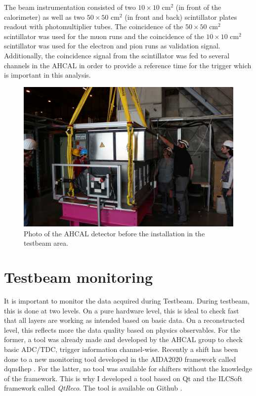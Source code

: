 The beam instrumentation consisted of two $10\times10$ cm$^2$ (in front of the calorimeter) as well as two $50\times50$ cm$^2$ (in front and back) scintillator plates readout with photomultiplier tubes. The coincidence of the $50\times50$ cm$^2$ scintillator was used for the muon runs and the coincidence of the $10\times10$ cm$^2$ scintillator was used for the electron and pion runs as validation signal. Additionally, the coincidence signal from the scintillator was fed to several channels in the AHCAL in order to provide a reference time for the trigger which is important in this analysis.
\begin{figure}[htbp!]
	\centering
	\includegraphics[width=0.7\linewidth]{chap5/fig_EnergyCalib/IMG_1170.jpg}
	\caption{Photo of the AHCAL detector before the installation in the testbeam area.} \label{fig:AHCAL_photo}
\end{figure}

\section{Testbeam monitoring}

It is important to monitor the data acquired during Testbeam. During testbeam, this is done at two levels. On a pure hardware level, this is ideal to check fast that all layers are working as intended based on basic data. On a reconstructed level, this reflects more the data quality based on physics observables. For the former, a tool was already made and developed by the AHCAL group to check basic ADC/TDC, trigger information channel-wise. Recently a shift has been done to a new monitoring tool developed in the AIDA2020 framework called \acrshort{dqm4hep} \cite{Ete:2291805}. For the latter, no tool was available for shifters without the knowledge of the framework. This is why I developed a tool based on Qt and the ILCSoft framework called \textit{QtReco}. The tool is available on Github \cite{GithubTB}.

